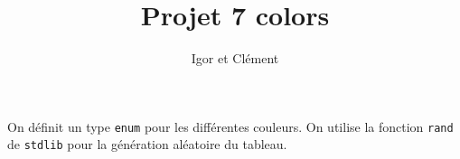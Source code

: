 \documentclass[12pt,L,fira-sans]{paper}
\title{Projet 7 colors}
\author{Igor \maj{Martayan} et Clément \maj{Morrand}}
\begin{document}
\maketitle

\begin{qu}
	On définit un type \verb|enum| pour les différentes couleurs.
	On utilise la fonction \verb|rand| de \verb|stdlib| pour la génération aléatoire du tableau.
\end{qu}
\end{document}
